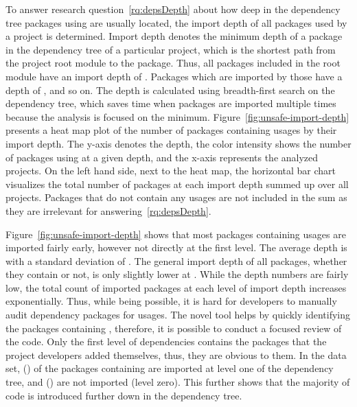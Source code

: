 To answer research question~\ref{rq:depsDepth} about how deep in the dependency tree packages using \unsafe{} are
usually located, the import depth of all packages used by a project is determined.
Import depth denotes the minimum depth of a package in the dependency tree of a particular project, which is the
shortest path from the project root module to the package.
Thus, all packages included in the root module have an import depth of .
Packages which are imported by those have a depth of , and so on.
The depth is calculated using breadth-first search on the dependency tree, which saves time when packages are imported
multiple times because the analysis is focused on the minimum.
Figure~\ref{fig:unsafe-import-depth} presents a heat map plot of the number of packages containing \unsafe{} usages by
their import depth.
The y-axis denotes the depth, the color intensity shows the number of packages using \unsafe{} at a given depth, and the
x-axis represents the \projsAnalyzed{} analyzed projects.
On the left hand side, next to the heat map, the horizontal bar chart visualizes the total number of packages at each
import depth summed up over all projects.
Packages that do not contain any \unsafe{} usages are not included in the sum as they are irrelevant for
answering~\ref{rq:depsDepth}.



Figure~\ref{fig:unsafe-import-depth} shows that most packages containing \unsafe{} usages are imported fairly early,
however not directly at the first level.
The average depth is \averageUnsafeImportDepth{} with a standard deviation of \stdUnsafeImportDepth{}.
The general import depth of all packages, whether they contain \unsafe{} or not, is only slightly lower at
\averageGeneralImportDepth{}.
While the depth numbers are fairly low, the total count of imported packages at each level of import depth increases
exponentially.
Thus, while being possible, it is hard for developers to manually audit dependency packages for \unsafe{} usages.
The novel \toolGeiger{} tool helps by quickly identifying the packages containing \unsafe{}, therefore, it is possible
to conduct a focused review of the \unsafe{} code.
Only the first level of dependencies contains the packages that the project developers added themselves, thus, they are
obvious to them.
In the data set, \levelOneImportedUnsafePackagesCount{} (\levelOneImportedUnsafePackagesShare{}) of the
\unsafePackages{} packages containing \unsafe{} are imported at level one of the dependency tree, and
\levelZeroImportedUnsafePackagesCount{} (\levelZeroImportedUnsafePackagesShare{}) are not imported (level zero).
This further shows that the majority of \unsafe{} code is introduced further down in the dependency tree.

